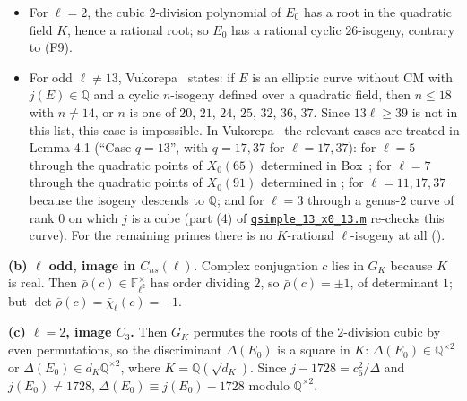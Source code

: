 \documentclass[11pt]{article}
\newcommand{\Q}{\mathbb Q}
\newcommand{\F}{\mathbb F}
\begin{document}
\begin{itemize}
\item For \(\ell=2\), the cubic \(2\)-division polynomial of \(E_0\) has a root in the quadratic field \(K\),
          hence a rational root; so \(E_0\) has a rational cyclic \(26\)-isogeny, contrary to (F9).
\item For odd \(\ell\neq13\), Vukorepa~\cite[Theorem 1]{Vuk} states: if \(E\) is an elliptic curve without CM with
          \(j(E)\in\Q\) and a cyclic \(n\)-isogeny defined over a quadratic field, then \(n\le18\) with \(n\neq14\), or \(n\) is one of
          \(20\), \(21\), \(24\), \(25\), \(32\), \(36\), \(37\). Since \(13\ell\ge39\) is not in this list, this case is impossible.
          In Vukorepa~\cite{Vuk} the relevant cases are treated in Lemma 4.1 (``Case \(q=13\)'', with \(q=17,37\) for
          \(\ell=17,37\)): for \(\ell=5\) through the quadratic points of \(X_0(65)\) determined in
          Box~\cite[§4.5]{Box}; for \(\ell=7\) through the quadratic points of \(X_0(91)\) determined in
          \cite[§13]{Vuk}; for \(\ell=11,17,37\) because the isogeny descends to \(\Q\); and for \(\ell=3\)
          through a genus-\(2\) curve of rank \(0\) on which \(j\) is a cube (part (4) of
          \href{https://genus-2-torsion.github.io/data/knowledge/sources/qsimple_13_x0_13.m}{\texttt{qsimple\_\allowbreak{}13\_\allowbreak{}x0\_\allowbreak{}13.m}} re-checks this curve). For the remaining primes there is no
          \(K\)-rational \(\ell\)-isogeny at all (\cite[§3]{Vuk}).
\end{itemize}

\textbf{(b) \(\ell\) odd, image in \(C_{ns}(\ell)\).} Complex conjugation \(c\) lies in \(G_K\) because \(K\) is
      real. Then \(\bar\rho(c)\in\F_{\ell^2}^\times\) has order dividing \(2\), so \(\bar\rho(c)=\pm1\), of determinant
      \(1\); but \(\det\bar\rho(c)=\bar\chi_\ell(c)=-1\).

\textbf{(c) \(\ell=2\), image \(C_3\).} Then \(G_K\) permutes the roots of the \(2\)-division cubic by even
      permutations, so the discriminant \(\Delta(E_0)\) is a square in \(K\): \(\Delta(E_0)\in\Q^{\times2}\) or
      \(\Delta(E_0)\in d_K\Q^{\times2}\), where \(K=\Q(\sqrt{d_K})\). Since \(j-1728=c_6^2/\Delta\) and
      \(j(E_0)\neq1728\), \(\Delta(E_0)\equiv j(E_0)-1728\) modulo \(\Q^{\times2}\).
\end{document}

